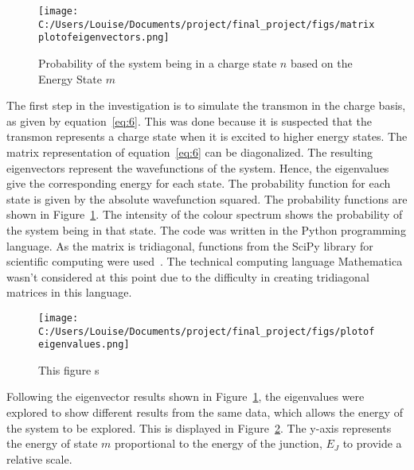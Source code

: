 \documentclass[11pt]{article}
\begin{document}
\begin{figure}[ht]
\centering
\texttt{[image: C:/Users/Louise/Documents/project/final\_project/figs/matrixplotofeigenvectors.png]}
\caption{Probability of the system being in a charge state $n$ based on the Energy State $m$ }
\label{fig:graph1}
\end{figure}
The first step in the investigation is to simulate the transmon in the charge basis, as given by equation~\ref{eq:6}. This was done because it is suspected that the transmon represents a charge state when it is excited to higher energy states. The matrix representation of equation~\ref{eq:6} can be diagonalized. The resulting eigenvectors represent the wavefunctions of the system. Hence, the eigenvalues give the corresponding energy for each state. The probability function for each state is given by the absolute wavefunction squared. The probability functions are shown in Figure~\ref{fig:graph1}. The intensity of the colour spectrum shows the probability of the system being in that state. The code was written in the Python programming language. As the matrix is tridiagonal, functions from the SciPy library for scientific computing were used~\cite{jonesSciPyOpenSource2001}. The technical computing language Mathematica wasn't considered at this point due to the difficulty in creating tridiagonal matrices in this language.
\begin{figure}[ht]
\centering
\texttt{[image: C:/Users/Louise/Documents/project/final\_project/figs/plotofeigenvalues.png]}
\caption{This figure s}
\label{fig:graph2}
\end{figure}
Following the eigenvector results shown in Figure~\ref{fig:graph1}, the eigenvalues were explored to show different results from the same data, which allows the energy of the system to be explored. This is displayed in Figure~\ref{fig:graph2}. The y-axis represents the energy of state $m$ proportional to the energy of the junction, $E_J$ to provide a relative scale.
\end{document}
